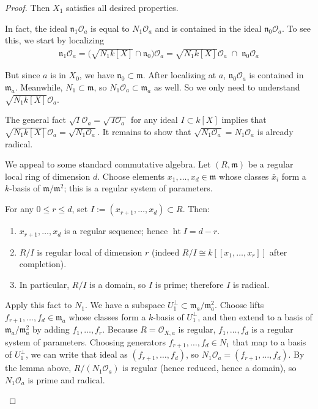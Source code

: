 \documentclass[12pt]{article}
\begin{document}
\begin{proof}
Then $X_1$ satisfies all desired properties.  

In fact, the ideal $\mathfrak{n}_1 \mathcal{O}_a$ is equal to $N_1 \mathcal{O}_a$ and is contained in the ideal $\mathfrak{n}_0 \mathcal{O}_a$. To see this, we start by localizing \begin{align*}
    \mathfrak n_1 \mathcal O_a
= \big(\sqrt{N_1 k[X]} \cap \mathfrak n_0\big)\mathcal O_a
= \sqrt{N_1 k[X]}\mathcal O_a \;\cap\; \mathfrak n_0 \mathcal O_a
\end{align*}

But since $a$ is in $X_0$, we have $\mathfrak{n}_0 \subset \mathfrak{m}$. After localizing at $a$, $\mathfrak{n}_0\mathcal{O}_a$ is contained in $\mathfrak{m}_a$. Meanwhile, $N_1\subset \mathfrak{m}$, so $N_1\mathcal{O}_a \subset \mathfrak{m}_a$ as well. So we only need to understand $\sqrt{N_1 k[X]}\mathcal{O}_a$.

The general fact $\sqrt{I}\mathcal{O}_a = \sqrt{\,I\mathcal{O}_a\,}$ for any ideal $I \subset k[X]$ implies that $\sqrt{N_1k[X]} \mathcal{O}_a = \sqrt{N_1 \mathcal{O}_a}$. It remains to show that $\sqrt{N_1\mathcal{O}_a} = N_1\mathcal{O}_a$ is already radical.

\begin{remark}
    We appeal to some standard commutative algebra. Let $(R,\mathfrak{m})$ be a regular local ring of dimension $d$.
    Choose elements $x_1,\dots,x_d\in\mathfrak{m}$ whose classes $\bar{x}_i$ form a $k$-basis of $\mathfrak{m}/\mathfrak{m}^2$; this is a regular system of parameters.

    For any $0\leq r\leq d$, set $I:=(x_{r+1},\dots,x_d)\subset R$. Then:
    \begin{enumerate}
        \item $x_{r+1},\dots,x_d$ is a regular sequence; hence $\operatorname{ht} I = d-r$.
        \item $R/I$ is regular local of dimension $r$ (indeed $R/I \cong k[[x_1,\dots,x_r]]$ after completion).
        \item In particular, $R/I$ is a domain, so $I$ is prime; therefore $I$ is radical.
    \end{enumerate}
Apply this fact to $N_1$. We have a subspace $U_1^\perp \subset \mathfrak{m}_a/\mathfrak{m}_a^2$. Choose lifts $f_{r+1},\dots,f_d \in \mathfrak{m}_a$ whose classes form a $k$-basis of $U_1^\perp$, and then extend to a basis of $\mathfrak{m}_a/\mathfrak{m}_a^2$ by adding $f_1,\dots,f_r$. Because $R=\mathcal{O}_{X,a}$ is regular, $f_1,\dots,f_d$ is a regular system of parameters. 
Choosing generators $f_{r+1},\dots,f_d\in N_1$ that map to a basis of $U_1^\perp$, we can write that ideal as $(f_{r+1},\dots,f_d)$, so $N_1\mathcal{O}_a = (f_{r+1},\dots,f_d)$. By the lemma above, $R/(N_1\mathcal{O}_a)$ is regular (hence reduced, hence a domain), so $N_1\mathcal{O}_a$ is prime and radical.
\end{remark}


\end{proof}
\end{document}
